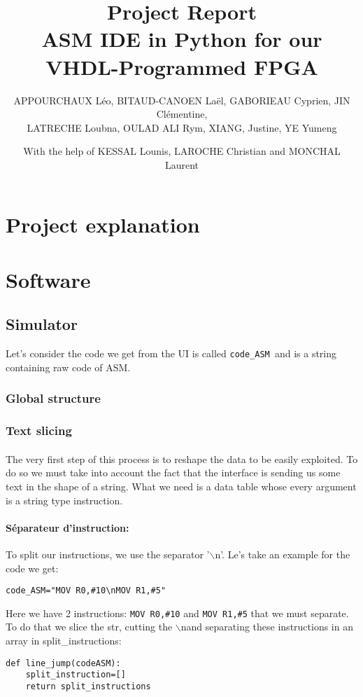 \documentclass{article}
\title{Project Report\\ASM IDE in Python for our VHDL-Programmed FPGA}
\author{APPOURCHAUX Léo, BITAUD-CANOEN Laël, GABORIEAU Cyprien, JIN Clémentine,\\LATRECHE Loubna, OULAD ALI Rym, XIANG, Justine, YE Yumeng}
\newcommand{\code}[1]{\fontfamily{zi4}\texttt{#1}}
\newcommand{\codeASM}[0]{\code{code\_ASM }}
\newcommand{\n}[0]{\(\backslash\)n}
\begin{document}
\maketitle
\author{With the help of KESSAL Lounis, LAROCHE Christian and MONCHAL Laurent}

\tableofcontents






\newpage
\section{Project explanation}


\newpage
\section{Software}
\subsection{Simulator}

Let's consider the code we get from the UI is called \codeASM  and is a string containing raw code of ASM. 
\subsubsection{Global structure}
\subsubsection{Text slicing}
\paragraph{}
The very first step of this process is to reshape the data to be easily exploited. To do so we must take into account the fact that the interface is sending us some text in the shape of a string. What we need is a data table whose every argument is a string type instruction.

\paragraph{Séparateur d'instruction:}
To split our instructions, we use the separator '\n'. Le's take an example for the code we get:
\begin{lstlisting}[language=MyPython]
code_ASM="MOV R0,#10\nMOV R1,#5"
\end{lstlisting}
Here we have 2 instructions: \code{MOV~R0,\#10} and \code{MOV~R1,\#5} that we must separate. To do that we slice the str, cutting the \n and separating these instructions in an array in split\_instructions:
\begin{lstlisting}[language=MyPython]
def line_jump(codeASM):
    split_instruction=[]
    return split_instructions
\end{lstlisting}
\end{document}
